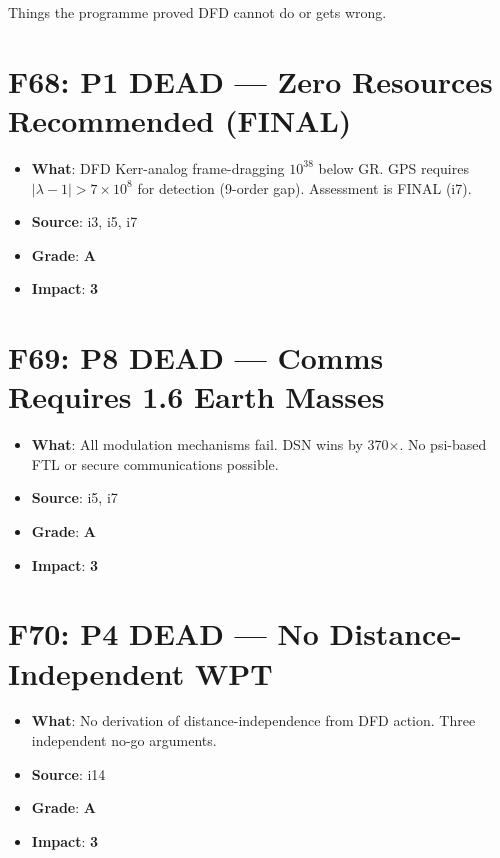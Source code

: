\documentclass[11pt,a4paper]{article}
\newcommand{\grade}[1]{\textbf{#1}}
\newcommand{\impact}[1]{\textbf{#1}}
\begin{document}
Things the programme proved DFD cannot do or gets wrong.

\section{F68: P1 DEAD --- Zero Resources Recommended (FINAL)}
\begin{itemize}[nosep]
\item \textbf{What}: DFD Kerr-analog frame-dragging $10^{38}$ below GR. GPS requires $|\lambda-1| > 7 \times 10^8$ for detection (9-order gap). Assessment is FINAL (i7).
\item \textbf{Source}: i3, i5, i7
\item \textbf{Grade}: \grade{A}
\item \textbf{Impact}: \impact{3}
\end{itemize}

\section{F69: P8 DEAD --- Comms Requires 1.6 Earth Masses}
\begin{itemize}[nosep]
\item \textbf{What}: All modulation mechanisms fail. DSN wins by 370$\times$. No psi-based FTL or secure communications possible.
\item \textbf{Source}: i5, i7
\item \textbf{Grade}: \grade{A}
\item \textbf{Impact}: \impact{3}
\end{itemize}

\section{F70: P4 DEAD --- No Distance-Independent WPT}
\begin{itemize}[nosep]
\item \textbf{What}: No derivation of distance-independence from DFD action. Three independent no-go arguments.
\item \textbf{Source}: i14
\item \textbf{Grade}: \grade{A}
\item \textbf{Impact}: \impact{3}
\end{itemize}
\end{document}
